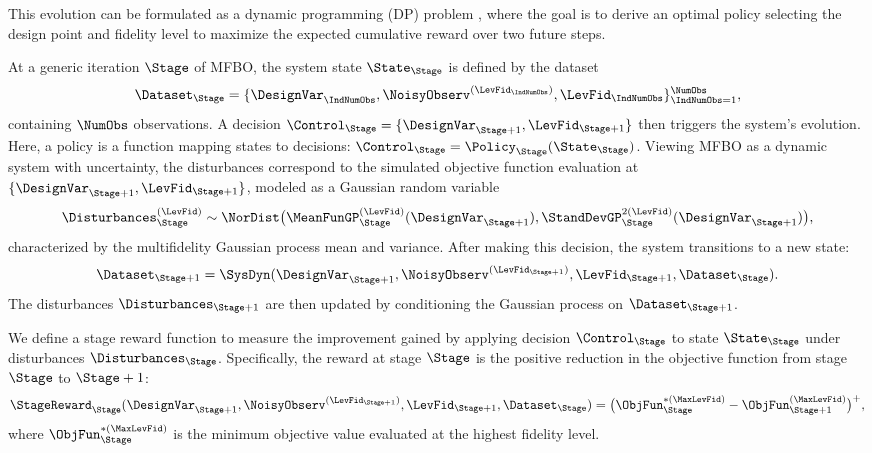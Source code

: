 This evolution can be formulated as a dynamic programming (DP) problem \cite{Bertsekas1995, Powell2007}, where the goal is to derive an optimal policy selecting the design point and fidelity level to maximize the expected cumulative reward over two future steps.

At a generic iteration \(\Stage\) of MFBO, the system state \(\State_{\Stage}\) is defined by the dataset 
\[
\Dataset_{\Stage} = \{ \DesignVar_{\IndNumObs}, \NoisyObserv^{(\LevFid_{\IndNumObs})}, \LevFid_{\IndNumObs} \}_{\IndNumObs=1}^{\NumObs},
\]
containing \(\NumObs\) observations. A decision \(\Control_{\Stage} = \{ \DesignVar_{\Stage+1}, \LevFid_{\Stage+1} \}\) then triggers the system's evolution. Here, a policy is a function mapping states to decisions: \(\Control_{\Stage} = \Policy_{\Stage}(\State_{\Stage})\). Viewing MFBO as a dynamic system with uncertainty, the disturbances correspond to the simulated objective function evaluation at \(\{\DesignVar_{\Stage+1}, \LevFid_{\Stage+1}\}\), modeled as a Gaussian random variable
\[
\Disturbances_{\Stage}^{(\LevFid)} \sim \NorDist \big( \MeanFunGP_{\Stage}^{(\LevFid)} (\DesignVar_{\Stage+1}), \StandDevGP_{\Stage}^{2(\LevFid)} (\DesignVar_{\Stage+1}) \big),
\]
characterized by the multifidelity Gaussian process mean and variance. After making this decision, the system transitions to a new state:
\begin{equation} \label{e:2LookMFAF1}
\Dataset_{\Stage+1} = \SysDyn(\DesignVar_{\Stage+1}, \NoisyObserv^{(\LevFid_{\Stage+1})}, \LevFid_{\Stage+1}, \Dataset_{\Stage}).
\end{equation}
The disturbances \(\Disturbances_{\Stage+1}\) are then updated by conditioning the Gaussian process on \(\Dataset_{\Stage+1}\).

We define a stage reward function to measure the improvement gained by applying decision \(\Control_{\Stage}\) to state \(\State_{\Stage}\) under disturbances \(\Disturbances_{\Stage}\). Specifically, the reward at stage \(\Stage\) is the positive reduction in the objective function from stage \(\Stage\) to \(\Stage+1\):
\begin{equation}\label{e:2LookMFAF2}
\StageReward_{\Stage}(\DesignVar_{\Stage+1}, \NoisyObserv^{(\LevFid_{\Stage+1})}, \LevFid_{\Stage+1}, \Dataset_{\Stage}) = \big( \ObjFun_{\Stage}^{*(\MaxLevFid)} - \ObjFun_{\Stage+1}^{(\MaxLevFid)} \big)^+,
\end{equation}
where \(\ObjFun_{\Stage}^{*(\MaxLevFid)}\) is the minimum objective value evaluated at the highest fidelity level.


